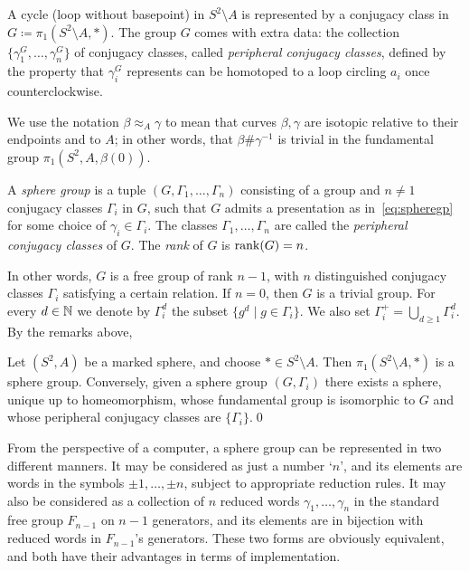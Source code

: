 \documentclass{amsart}
\begin{document}
A cycle (loop without basepoint) in $S^2\setminus A $ is represented
by a conjugacy class in $G\coloneqq\pi_1(S^2\setminus A ,*)$. The
group $G$ comes with extra data: the collection
$\{\gamma_1^G,\dots,\gamma_n^G\}$ of conjugacy classes, called
\emph{peripheral conjugacy classes}, defined by the property that
$\gamma_i^G$ represents can be homotoped to a loop circling $a_i$ once
counterclockwise.

We use the notation $\beta\approx_A\gamma$ to mean that curves
$\beta,\gamma$ are isotopic relative to their endpoints and to $A$; in
other words, that $\beta\#\gamma^{-1}$ is trivial in the fundamental
group $\pi_1(S^2,A,\beta(0))$.

\begin{defn}\label{defn:sphere groups}
  A \emph{sphere group} is a tuple $(G,\Gamma_1,\dots,\Gamma_n)$
  consisting of a group and $n\neq1$ conjugacy classes $\Gamma_i$ in $G$,
  such that $G$ admits a presentation as in~\eqref{eq:spheregp} for
  some choice of $\gamma_i\in\Gamma_i$. The classes
  $\Gamma_1,\dots,\Gamma_n$ are called the \emph{peripheral conjugacy
    classes} of $G$.
  The \emph{rank} of $G$ is ${\operatorname{rank}}(G)=n$.
\end{defn}
In other words, $G$ is a free group of rank $n-1$, with $n$
distinguished conjugacy classes $\Gamma_i$ satisfying a certain
relation. If $n=0$, then $G$ is a trivial group. For every $d\in{\mathbb N}$ we
denote by $\Gamma_i^d$ the subset $\{g^d \mid g\in\Gamma_i\}$. We also
set $\Gamma^+_i=\bigcup_{d\ge 1} \Gamma^d_i$.  By the remarks above,
\begin{lem}\label{lem:sphere to sphere group}
  Let $(S^2,A)$ be a marked sphere, and choose $*\in S^2\setminus A$. Then
  $\pi_1(S^2\setminus A,*)$ is a sphere group. Conversely, given a sphere
  group $(G,\Gamma_i)$ there exists a sphere, unique up to homeomorphism,
  whose fundamental group is isomorphic to $G$ and whose peripheral
  conjugacy classes are $\{\Gamma_i\}$.\qed
\end{lem}

From the perspective of a computer, a sphere group can be represented
in two different manners. It may be considered as just a number `$n$',
and its elements are words in the symbols $\pm1,\dots,\pm n$, subject
to appropriate reduction rules. It may also be considered as a
collection of $n$ reduced words $\gamma_1,\dots,\gamma_n$ in the
standard free group $F_{n-1}$ on $n-1$ generators, and its elements
are in bijection with reduced words in $F_{n-1}$'s generators. These
two forms are obviously equivalent, and both have their advantages in
terms of implementation.
\end{document}
